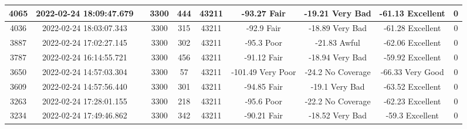 \begin{longtable*}{|c|c|c|c|c|c|c|c|c|c|}
4065&2022-02-24 18:09:47.679&&3300&444&43211& -93.27    Fair        & -19.21    Very Bad    & -61.13    Excellent   & 0\\\hline
{}4036&2022-02-24 18:03:07.343&&3300&315&43211& -92.9     Fair        & -18.89    Very Bad    & -61.28    Excellent   & 0\\\hline
{}3887&2022-02-24 17:02:27.145&&3300&302&43211& -95.3     Poor        & -21.83    Awful       & -62.06    Excellent   & 0\\\hline
{}3787&2022-02-24 16:14:55.721&&3300&456&43211& -91.12    Fair        & -18.94    Very Bad    & -59.92    Excellent   & 0\\\hline
{}3650&2022-02-24 14:57:03.304&&3300&57&43211& -101.49   Very Poor   & -24.2     No Coverage & -66.33    Very Good   & 0\\\hline
{}3609&2022-02-24 14:57:56.440&&3300&301&43211& -94.85    Fair        & -19.1     Very Bad    & -63.52    Excellent   & 0\\\hline
{}3263&2022-02-24 17:28:01.155&&3300&218&43211& -95.6     Poor        & -22.2     No Coverage & -62.23    Excellent   & 0\\\hline
{}3234&2022-02-24 17:49:46.862&&3300&342&43211& -90.21    Fair        & -18.52    Very Bad    & -59.3     Excellent   & 0\\\hline

\end{longtable*}
